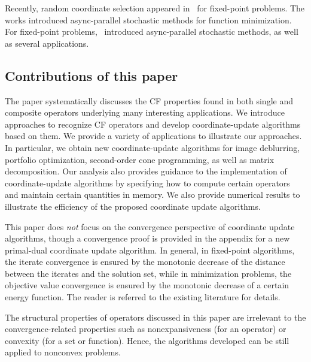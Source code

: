Recently, random coordinate selection appeared in~\cite{Patrick_2015} for fixed-point problems. The works \cite{nedic2001distributed,recht2011hogwild,liu2013asynchronous,liu2014asynchronous,hsieh2015passcode} introduced async-parallel stochastic methods for function minimization.
For fixed-point problems,~\cite{Peng_2015_AROCK} introduced  async-parallel stochastic methods, as well as several applications.

\subsection{Contributions of this paper}
The paper systematically discusses the CF properties found in both single and composite operators underlying many interesting applications. We introduce approaches to recognize CF operators and develop coordinate-update algorithms based on them.
We provide a variety of applications to illustrate our approaches.
In particular, we obtain new coordinate-update algorithms for image deblurring, portfolio optimization, second-order cone programming, as well as matrix decomposition. Our analysis also provides guidance to the implementation of coordinate-update algorithms by specifying how to compute certain operators and maintain certain quantities in memory. We also provide numerical results to illustrate the efficiency of the proposed coordinate update algorithms.

This paper does \emph{not} focus on the convergence perspective of coordinate update algorithms, though a convergence proof is provided in the appendix for a new primal-dual coordinate update algorithm. In general, in fixed-point algorithms, the iterate convergence is ensured by the monotonic decrease of the distance between the iterates and the solution set, while in minimization problems, the objective value convergence is ensured by the monotonic decrease of a certain energy function. The reader is referred to the existing literature for details.


The structural properties of operators discussed in this paper are irrelevant to  the convergence-related properties such as nonexpansiveness (for an operator) or convexity (for a set or function). Hence, the algorithms developed can be still applied to nonconvex problems.


